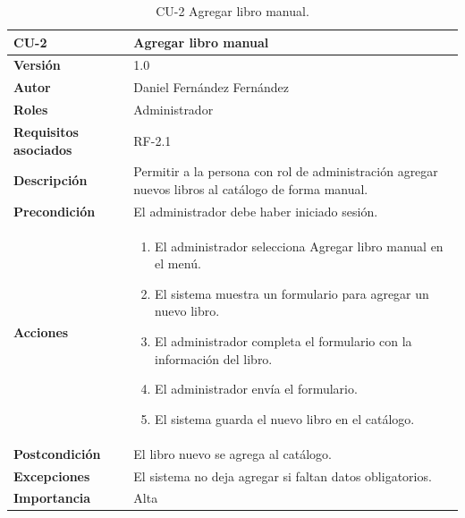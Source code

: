 \begin{table}[p]
        \centering
        \begin{tabularx}{\linewidth}{ p{} p{} }
            \toprule
            \textbf{CU-2} & \textbf{Agregar libro manual}\\
            \toprule
            \textbf{Versión} & 1.0 \\
            \textbf{Autor} & Daniel Fernández Fernández \\
            \textbf{Roles} & Administrador \\
            \textbf{Requisitos asociados} & RF-2.1 \\
            \textbf{Descripción} & Permitir a la persona con rol de administración agregar nuevos libros al catálogo de forma manual. \\
            \textbf{Precondición} & El administrador debe haber iniciado sesión. \\
            \textbf{Acciones} &
            \begin{enumerate}
            \def\labelenumi{\arabic{enumi}.}
            \tightlist
            \item El administrador selecciona Agregar libro manual en el menú.
            \item El sistema muestra un formulario para agregar un nuevo libro.
            \item El administrador completa el formulario con la información del libro.
            \item El administrador envía el formulario.
            \item El sistema guarda el nuevo libro en el catálogo.
            \end{enumerate}\\
            \textbf{Postcondición} & El libro nuevo se agrega al catálogo. \\
            \textbf{Excepciones} & El sistema no deja agregar si faltan datos obligatorios. \\
            \textbf{Importancia} & Alta \\
            \bottomrule
        \end{tabularx}
        \caption{CU-2 Agregar libro manual.}
\end{table}

